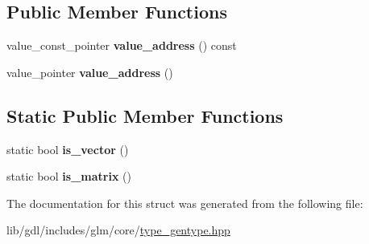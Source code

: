 \subsection*{Public Member Functions}
\begin{DoxyCompactItemize}
\item 
\hypertarget{structglm_1_1detail_1_1gen_type_a63fb77e77082f34c0a0d7faa0906f7f4}{}value\+\_\+const\+\_\+pointer {\bfseries value\+\_\+address} () const \label{structglm_1_1detail_1_1gen_type_a63fb77e77082f34c0a0d7faa0906f7f4}

\item 
\hypertarget{structglm_1_1detail_1_1gen_type_a146973ec142766743080c1895a9e3c65}{}value\+\_\+pointer {\bfseries value\+\_\+address} ()\label{structglm_1_1detail_1_1gen_type_a146973ec142766743080c1895a9e3c65}

\end{DoxyCompactItemize}
\subsection*{Static Public Member Functions}
\begin{DoxyCompactItemize}
\item 
\hypertarget{structglm_1_1detail_1_1gen_type_ae83087df55201bdc46a37decf3d1c34c}{}static bool {\bfseries is\+\_\+vector} ()\label{structglm_1_1detail_1_1gen_type_ae83087df55201bdc46a37decf3d1c34c}

\item 
\hypertarget{structglm_1_1detail_1_1gen_type_a78c650375558d5e2ccfba383cdb59479}{}static bool {\bfseries is\+\_\+matrix} ()\label{structglm_1_1detail_1_1gen_type_a78c650375558d5e2ccfba383cdb59479}

\end{DoxyCompactItemize}


The documentation for this struct was generated from the following file\+:\begin{DoxyCompactItemize}
\item 
lib/gdl/includes/glm/core/\hyperlink{type__gentype_8hpp}{type\+\_\+gentype.\+hpp}\end{DoxyCompactItemize}
